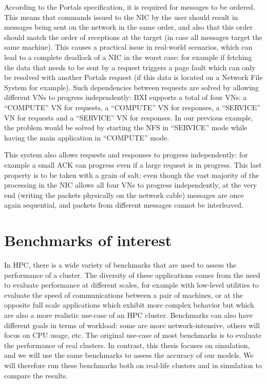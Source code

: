 According to the Portals specification, it is required for messages to be
ordered. This means that commands issued to the NIC by the user should result in
messages being sent on the network in the same order, and also that this order
should match the order of receptions at the target (in case all messages target
the same machine). This causes a practical issue in real-world scenarios, which
can lead to a complete deadlock of a NIC in the worst case: for example if
fetching the data that needs to be sent by a request triggers a page fault which
can only be resolved with another Portals request (if this data is located on a
Network File System for example). Such dependencies between requests are solved
by allowing different VNs to progress independently: BXI supports a total of
four VNs: a ``COMPUTE'' VN for requests, a ``COMPUTE'' VN for responses, a
``SERVICE'' VN for requests and a ``SERVICE'' VN for responses. In our previous
example, the problem would be solved by starting the NFS in ``SERVICE'' mode
while having the main application in ``COMPUTE'' mode.

This system also allows requests and responses to progress independently: for
example a small ACK can progress even if a large request is in progress. This last
property is to be taken with a grain of salt: even though the vast majority of
the processing in the NIC allows all four VNs to progress independently, at the
very end (writing the packets physically on the network cable) messages are once
again sequential, and packets from different messages cannot be
interleaved.

\section{Benchmarks of interest}
\label{sec:2_context_hpc:benchmarks}

In HPC, there is a wide variety of benchmarks that are used to assess the
performance of a cluster. The diversity of these applications comes from the
need to evaluate performance at different scales, for example with low-level
utilities to evaluate the speed of communications between a pair of machines, or
at the opposite full scale applications which exhibit more complex behavior but
which are also a more realistic use-case of an HPC cluster. Benchmarks can also
have different goals in terms of workload: some are more network-intensive,
others will focus on CPU usage, etc. The original use-case of most benchmarks is
to evaluate the performance of real clusters. In contrast, this thesis focuses
on simulation, and we will use the same benchmarks to assess the accuracy of our
models. We will therefore run these benchmarks both on real-life clusters and in
simulation to compare the results.

